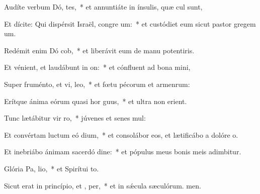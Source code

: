 \item Audíte verbum Dó, tes,~* et annuntiáte in ínsulis, quæ cul sunt,
\item Et dícite: Qui dispérsit Israël, congre um:~* et custódiet eum sicut pastor gregem um.
\item Redémit enim Dó cob,~* et liberávit eum de manu potentiris.
\item Et vénient, et laudábunt in  on:~* et cónfluent ad bona mini,
\item Super fruménto, et vi,  leo,~* et fœtu pécorum et armenrum:
\item Erítque ánima eórum quasi hor guus,~* et ultra non erient.
\item Tunc lætábitur vir  ro,~* júvenes et senes mul:
\item Et convértam luctum eó  dium,~* et consolábor eos, et lætificábo a dolóre o.
\item Et inebriábo ánimam sacerdó dine:~* et pópulus meus bonis meis adimbitur.
\item Glória Pa,  lio,~* et Spirítui to.
\item Sicut erat in princípio, et ,  per,~* et in sǽcula sæculórum. men.
